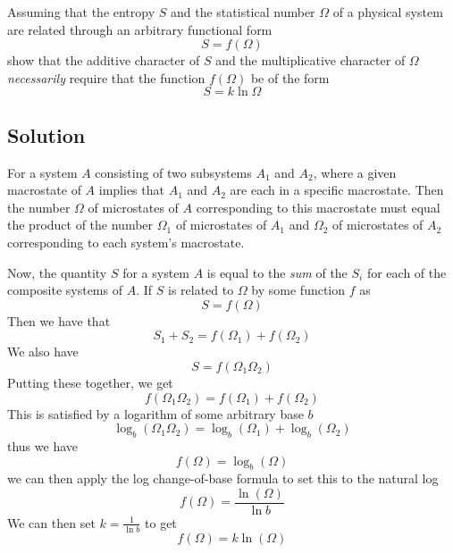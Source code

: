 Assuming that the entropy $S$ and the statistical number
$\Omega$ of a physical system are related through an arbitrary
functional form
\[ S = f(\Omega)\]
show that the additive character of $S$ and the multiplicative
character of $\Omega$ \emph{necessarily} require that the function
$f(\Omega)$ be of the form
\[ S = k\ln\Omega \]

\subsection*{Solution}

For a system $A$ consisting of two subsystems $A_1$ and $A_2$, where a
given macrostate of $A$ implies that $A_1$ and $A_2$ are each in a
specific macrostate.  Then the number $\Omega$ of microstates of $A$
corresponding to this macrostate must equal the product of the number
$\Omega_1$ of microstates of $A_1$ and $\Omega_2$ of microstates of
$A_2$ corresponding to each system's macrostate.

Now, the quantity $S$ for a system $A$ is equal to the \emph{sum} of
the $S_i$ for each of the composite systems of $A$.  If $S$ is related
to $\Omega$ by some function $f$ as
\[ S = f(\Omega) \]
Then we have that
\[ S_1 + S_2 = f(\Omega_1) + f(\Omega_2) \]
We also have
\[ S = f(\Omega_1\Omega_2) \]
Putting these together, we get
\[ f(\Omega_1\Omega_2) = f(\Omega_1) + f(\Omega_2) \]
This is satisfied by a logarithm of some arbitrary base $b$
\[ \log_b(\Omega_1\Omega_2) = \log_b(\Omega_1) + \log_b(\Omega_2) \]
thus we have
\[ f(\Omega) = \log_b(\Omega) \]
we can then apply the log change-of-base formula to set this to the
natural log
\[ f(\Omega) = \frac{\ln(\Omega)}{\ln b} \]
We can then set $k = \frac{1}{\ln b}$ to get
\[ f(\Omega) = k\ln(\Omega) \]
